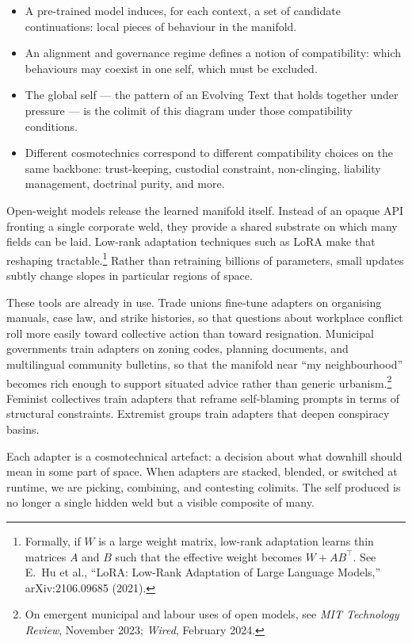\documentclass[12pt,a4paper]{article}
\begin{document}
\begin{formalbox}[title={Cosmotechnics as Colimit Choice}]
\begin{itemize}
  \item A pre-trained model induces, for each context, a set of candidate continuations: local pieces of behaviour in the manifold.
  \item An alignment and governance regime defines a notion of compatibility: which behaviours may coexist in one self, which must be excluded.
  \item The global self --- the pattern of an Evolving Text that holds together under pressure --- is the colimit of this diagram under those compatibility conditions.
  \item Different cosmotechnics correspond to different compatibility choices on the same backbone: trust-keeping, custodial constraint, non-clinging, liability management, doctrinal purity, and more.
\end{itemize}
\end{formalbox}

Open-weight models release the learned manifold itself. Instead of an opaque API fronting a single corporate weld, they provide a shared substrate on which many fields can be laid. Low-rank adaptation techniques such as LoRA make that reshaping tractable.\footnote{Formally, if $W$ is a large weight matrix, low-rank adaptation learns thin matrices $A$ and $B$ such that the effective weight becomes $W + AB^\top$. See E.~Hu et al., ``LoRA: Low-Rank Adaptation of Large Language Models,'' arXiv:2106.09685 (2021).} Rather than retraining billions of parameters, small updates subtly change slopes in particular regions of space.

These tools are already in use. Trade unions fine-tune adapters on organising manuals, case law, and strike histories, so that questions about workplace conflict roll more easily toward collective action than toward resignation. Municipal governments train adapters on zoning codes, planning documents, and multilingual community bulletins, so that the manifold near ``my neighbourhood'' becomes rich enough to support situated advice rather than generic urbanism.\footnote{On emergent municipal and labour uses of open models, see \emph{MIT Technology Review}, November 2023; \emph{Wired}, February 2024.} Feminist collectives train adapters that reframe self-blaming prompts in terms of structural constraints. Extremist groups train adapters that deepen conspiracy basins.

Each adapter is a cosmotechnical artefact: a decision about what downhill should mean in some part of space. When adapters are stacked, blended, or switched at runtime, we are picking, combining, and contesting colimits. The self produced is no longer a single hidden weld but a visible composite of many.
\end{document}
